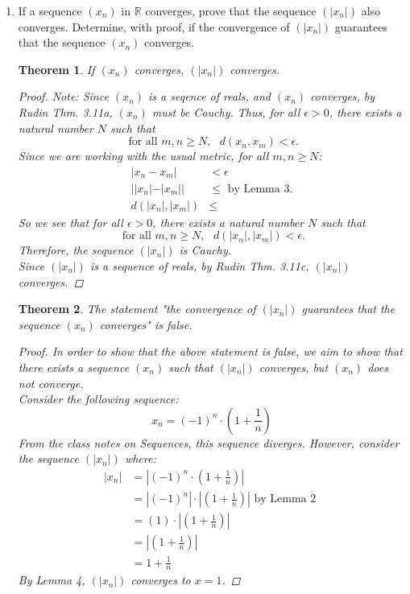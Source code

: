 \documentclass{amsart}
\newtheorem{theorem}{Theorem}
\begin{document}
\begin{enumerate}[1.]
\item  If a sequence $(x_n)$ in $\mathbb{R}$ converges, prove that the sequence $(|x_n|)$ also converges. Determine, with proof, if the convergence of $(|x_n|)$ guarantees that the sequence $(x_n)$ converges.

\begin{theorem} If $(x_n)$ converges, $(|x_n|)$ converges.
    \begin{proof}
        Note: Since $(x_n)$ is a seqence of reals, and $(x_n)$ converges, by Rudin Thm. 3.11a, $(x_n)$ must be Cauchy. Thus,
        for all $\epsilon > 0$, there exists a natural number $N$ such that 
        \[
            \text{ for all } m,n \geq N, \text{ } d(x_n, x_m) < \epsilon.
        \]
        Since we are working with the usual metric, for all $m,n \geq N$:
        \begin{align*}
            |x_n - x_m| &< \epsilon \\
            ||x_n| - |x_m|| &\leq \text{ by Lemma 3}. \\
            d(|x_n|,|x_m|) &\leq
        \end{align*}
        So we see that for all $\epsilon > 0$, there exists a natural number $N$ such that
        \[
            \text{ for all } m,n \geq N, \text{ } d(|x_n|, |x_m|) < \epsilon.
        \]
        Therefore, the sequence $(|x_n|)$ is Cauchy. \\
        Since $(|x_n|)$ is a sequence of reals,
        by Rudin Thm. 3.11c, $(|x_n|)$ converges.
    \end{proof}
\end{theorem}

\begin{theorem} The statement "the convergence of $(|x_n|)$ guarantees that the sequence $(x_n)$ converges" is false.
    \begin{proof}
        In order to show that the above statement is false, we aim to show that there exists a sequence
        $(x_n)$ such that $(|x_n|)$ converges, but $(x_n)$ does not converge. \\
        
        Consider the following sequence:
        \[
            x_n = (-1)^n\cdot \left(1 + \frac{1}{n} \right)    
        \]
        From the class notes on Sequences, this sequence diverges. However, consider the sequence $(|x_n|)$ where:
        \begin{align*}
            |x_n| &= \left|(-1)^n\cdot \left(1 + \frac{1}{n} \right)\right| \\
            &= |(-1)^n|\cdot \left|\left(1 + \frac{1}{n} \right)\right| \text{ by Lemma 2 } \\
            &= (1) \cdot \left|\left(1 + \frac{1}{n} \right)\right| \\
            &= \left|\left(1 + \frac{1}{n} \right)\right| \\
            &= 1 + \frac{1}{n}
        \end{align*}
        By Lemma 4, $(|x_n|)$ converges to $x = 1$.


\end{proof}
\end{theorem}
\end{enumerate}
\end{document}
